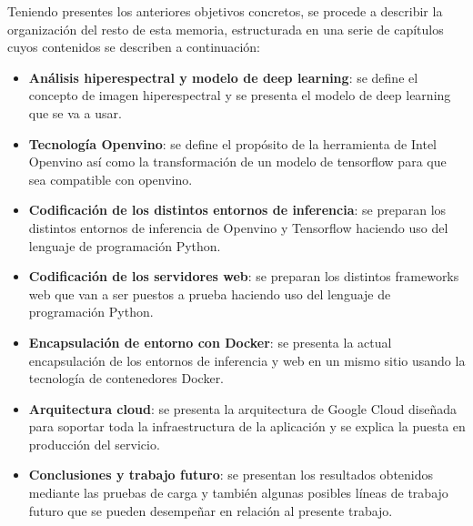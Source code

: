 Teniendo presentes los anteriores objetivos concretos, se procede a describir la organización del resto de esta memoria, estructurada en una serie de capítulos cuyos contenidos se
describen a continuación:

\begin{itemize}
    \item \textbf{Análisis hiperespectral y modelo de deep learning}: se define el concepto de imagen hiperespectral y se presenta el modelo de deep learning que se va a usar.
    \item \textbf{Tecnología Openvino}: se define el propósito de la herramienta de Intel Openvino así como la transformación de un modelo de tensorflow para que sea compatible con openvino.
    \item \textbf{Codificación de los distintos entornos de inferencia}: se preparan los distintos entornos de inferencia de Openvino y Tensorflow haciendo uso del lenguaje de programación Python.
    \item \textbf{Codificación de los servidores web}: se preparan los distintos frameworks web que van a ser puestos a prueba haciendo uso del lenguaje de programación Python.
    \item \textbf{Encapsulación de entorno con Docker}: se presenta la actual encapsulación de los entornos de inferencia y web en un mismo sitio usando la tecnología de contenedores Docker.
    \item \textbf{Arquitectura cloud}: se presenta la arquitectura de Google Cloud diseñada para soportar toda la infraestructura de la aplicación y se explica la puesta en producción del servicio.
    \item \textbf{Conclusiones y trabajo futuro}: se presentan los resultados obtenidos mediante las pruebas de carga y también algunas posibles líneas de trabajo futuro que se pueden desempeñar en relación al presente trabajo.
\end{itemize}